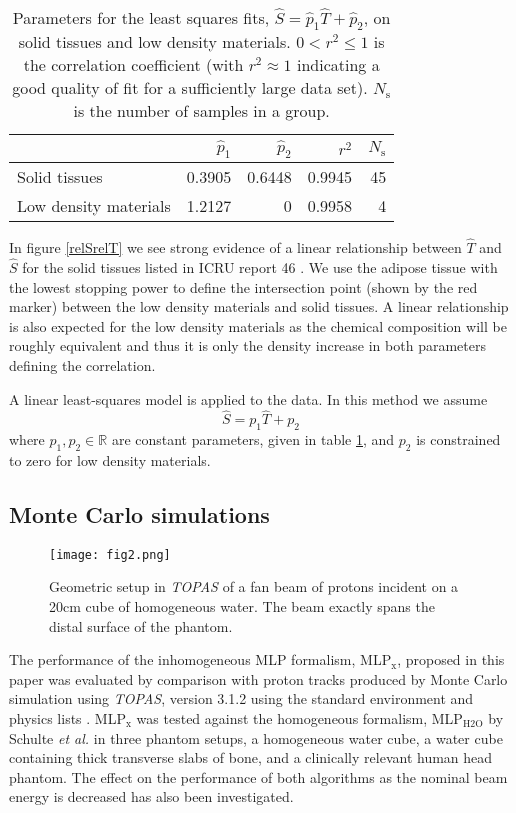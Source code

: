 \documentclass[preprint,times]{elsarticle}
\newcommand{\Fig}[1]{figure #1} %
\newcommand{\Tab}[1]{table #1} %
\begin{document}
\begin{table}[b]
\centering
\caption{Parameters for the least squares fits, $\hat{S} = \hat{p}_1\hat{T}+\hat{p}_2$, on solid tissues and low density materials. $0 < r^2 \leq 1$ is the correlation coefficient (with $r^2 \approx 1$ indicating a good quality of fit for a sufficiently large data set). $N_\mathrm{s}$ is the number of samples in a group.}\label{params}
\footnotesize
\renewcommand{\arraystretch}{1.5}
\begin{tabular}{l r r r r}
 & $\hat{p}_1$ & $\hat{p}_2$ & $r^2$ & $N_\mathrm{s}$ \\
 \hline
 Solid tissues & 0.3905 & 0.6448 & 0.9945 & 45 \\
 Low density materials & 1.2127 & 0 & 0.9958 & 4
\end{tabular}
\end{table}

In \Fig{\ref{relSrelT}} we see strong evidence of a linear relationship between $\hat{T}$ and $\hat{S}$ for the solid tissues listed in ICRU report 46 \citep{ICRU46}. We use the adipose tissue with the lowest stopping power to define the intersection point (shown by the red marker) between the low density materials and solid tissues. A linear relationship is also expected for the low density materials as the chemical composition will be roughly equivalent and thus it is only the density increase in both parameters defining the correlation.

A linear least-squares model is applied to the data. In this method we assume
\begin{equation}
\hat{S} = p_1\hat{T} + p_2
\end{equation}\label{calibrationeq}
where $p_1, p_2 \in \mathbb{R}$ are constant parameters, given in \Tab{\ref{params}}, and $p_2$ is constrained to zero for low density materials.


\subsection{Monte Carlo simulations}\label{MCsec}

\begin{figure}[t]
\centering
\texttt{[image: fig2.png]}
\caption{Geometric setup in \emph{TOPAS} of a fan beam of protons incident on a 20cm cube of homogeneous water. The beam exactly spans the distal surface of the phantom.}\label{fanbeam}
\end{figure}

The performance of the inhomogeneous MLP formalism, MLP$_\mathrm{x}$, proposed in this paper was evaluated by comparison with proton tracks produced by Monte Carlo simulation using \emph{TOPAS}, version 3.1.2 using the standard environment and physics lists \citep{TOPAS}. MLP$_\mathrm{x}$ was tested against the homogeneous formalism, MLP$_\mathrm{H2O}$ by Schulte \emph{et al.} \citep{penfoldMLP} in three phantom setups, a homogeneous water cube, a water cube containing thick transverse slabs of bone, and a clinically relevant human head phantom. The effect on the performance of both algorithms as the nominal beam energy is decreased has also been investigated.
\end{document}

